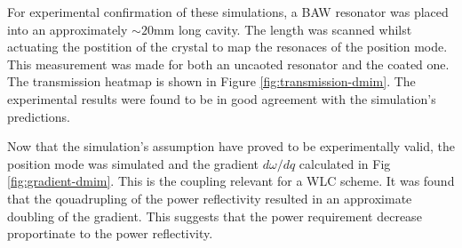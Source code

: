 \documentclass[aps,  
                a4paper, 
                amsmath, 
                amssymb, 
                preprint,
                tightenlines,  
                amsfonts,
                nofootinbib,
                onecolumn,
                titlepage,
                10pt
            ]{revtex4-2}
\begin{document}
    \par
    For experimental confirmation of these simulations, a BAW resonator was placed into an approximately $\sim20$mm long cavity. The length was scanned whilst actuating the postition of the crystal to map the resonaces of the position mode. This measurement was made for both an uncaoted resonator and the coated one. The transmission heatmap is shown in Figure \ref{fig:transmission-dmim}. The experimental results were found to be in good agreement with the simulation's predictions.
    \par
    Now that the simulation's assumption have proved to be experimentally valid, the position mode was simulated and the gradient $d\omega/dq$ calculated in Fig \ref{fig:gradient-dmim}. This is the coupling relevant for a WLC scheme. It was found that the qouadrupling of the power reflectivity resulted in an approximate doubling of the gradient. This suggests that the power requirement decrease proportinate to the power reflectivity. 
\end{document}
